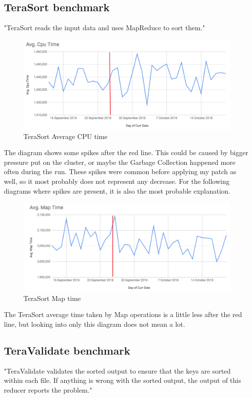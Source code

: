 \subsection{TeraSort benchmark}
"TeraSort reads the input data and uses MapReduce to sort them." \cite{terasort}

\begin{figure}[H]
	\includegraphics[width=125mm, keepaspectratio]{figures/terasort_cpu.png}
	\centering
	\caption{TeraSort Average CPU time}
\end{figure}

The diagram shows some spikes after the red line. This could be caused by bigger pressure put on the cluster, or maybe the Garbage Collection happened more often during the run. These spikes were common before applying my patch as well, so it most probably does not represent any decrease. For the following diagrams where spikes are present, it is also the most probable explanation.

\begin{figure}[H]
	\includegraphics[width=125mm, keepaspectratio]{figures/terasort_map.png}
	\centering
	\caption{TeraSort Map time}
\end{figure}

The TeraSort average time taken by Map operations is a little less after the red line, but looking into only this diagram does not mean a lot.

\subsection{TeraValidate benchmark}
"TeraValidate validates the sorted output to ensure that the keys are sorted within each file. If anything is wrong with the sorted output, the output of this reducer reports the problem." \cite{terasort}

